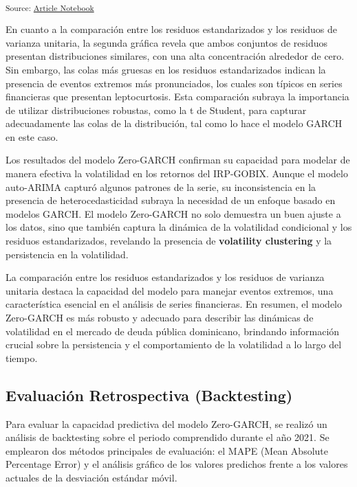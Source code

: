 \documentclass[
  number,
  preprint,
  3p,
  onecolumn]{elsarticle}
\begin{document}
\textsubscript{Source:
\href{https://iancont.github.io/fixed_income_garch/index-preview.html}{Article
Notebook}}

En cuanto a la comparación entre los residuos estandarizados y los
residuos de varianza unitaria, la segunda gráfica revela que ambos
conjuntos de residuos presentan distribuciones similares, con una alta
concentración alrededor de cero. Sin embargo, las colas más gruesas en
los residuos estandarizados indican la presencia de eventos extremos más
pronunciados, los cuales son típicos en series financieras que presentan
leptocurtosis. Esta comparación subraya la importancia de utilizar
distribuciones robustas, como la t de Student, para capturar
adecuadamente las colas de la distribución, tal como lo hace el modelo
GARCH en este caso.

Los resultados del modelo Zero-GARCH confirman su capacidad para modelar
de manera efectiva la volatilidad en los retornos del IRP-GOBIX. Aunque
el modelo auto-ARIMA capturó algunos patrones de la serie, su
inconsistencia en la presencia de heterocedasticidad subraya la
necesidad de un enfoque basado en modelos GARCH. El modelo Zero-GARCH no
solo demuestra un buen ajuste a los datos, sino que también captura la
dinámica de la volatilidad condicional y los residuos estandarizados,
revelando la presencia de \textbf{volatility clustering} y la
persistencia en la volatilidad.

La comparación entre los residuos estandarizados y los residuos de
varianza unitaria destaca la capacidad del modelo para manejar eventos
extremos, una característica esencial en el análisis de series
financieras. En resumen, el modelo Zero-GARCH es más robusto y adecuado
para describir las dinámicas de volatilidad en el mercado de deuda
pública dominicano, brindando información crucial sobre la persistencia
y el comportamiento de la volatilidad a lo largo del tiempo.

\subsection{Evaluación Retrospectiva
(Backtesting)}\label{evaluaciuxf3n-retrospectiva-backtesting}

Para evaluar la capacidad predictiva del modelo Zero-GARCH, se realizó
un análisis de backtesting sobre el periodo comprendido durante el año
2021. Se emplearon dos métodos principales de evaluación: el MAPE (Mean
Absolute Percentage Error) y el análisis gráfico de los valores
predichos frente a los valores actuales de la desviación estándar móvil.
\end{document}
